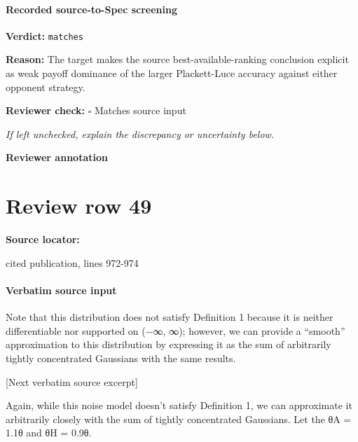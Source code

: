 \documentclass[10pt]{article}
\newcommand{\reviewerbox}{%
  \par\noindent\fbox{\parbox{0.96\linewidth}{\rule{0pt}{0.38in}}}\par
}
\newcommand{\reviewmatch}[1]{%
  \par\noindent\textbf{Reviewer check:} $\square$\; #1\par
  \noindent\emph{If left unchecked, explain the discrepancy or uncertainty below.}\par
}
\begin{document}
\paragraph{Recorded source-to-Spec screening}
\textbf{Verdict:} \texttt{matches}
\\
{\raggedright
\textbf{Reason:} The target makes the source best-\allowbreak{}available-\allowbreak{}ranking conclusion explicit as weak payoff dominance of the larger Plackett-\allowbreak{}Luce accuracy against either opponent strategy.\allowbreak{}
\par}
\reviewmatch{Matches source input}
\noindent\textbf{Reviewer annotation}\par
\reviewerbox
\clearpage
\hypertarget{source-claim-4cfc28215a7bcccf}{}
\section*{Review row 49}
\textbf{Source locator:} {\footnotesize\raggedright cited publication, lines 972-\allowbreak{}974\par}
\paragraph{Verbatim source input}
\begin{ReviewVerbatim}
Note that this distribution does not satisfy Definition 1 because it is neither differentiable nor supported on
(−∞, ∞); however, we can provide a “smooth” approximation to this distribution by expressing it as the
sum of arbitrarily tightly concentrated Gaussians with the same results.

[Next verbatim source excerpt]

Again, while this noise model doesn’t satisfy Definition 1, we can approximate it arbitrarily closely with the
sum of tightly concentrated Gaussians. Let the θA = 1.1θ and θH = 0.9θ.
\end{ReviewVerbatim}
\end{document}
